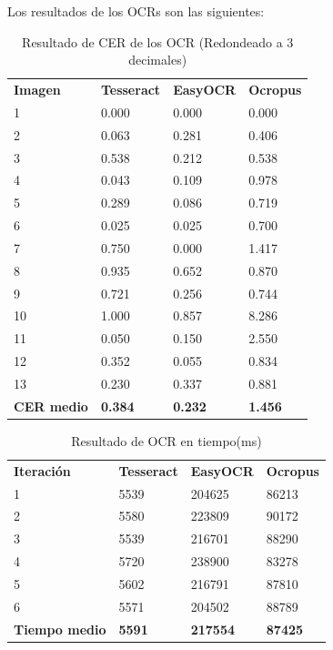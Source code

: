 Los resultados de los OCRs son las siguientes:
	\begin{table}[H]
		\centering
		\caption{Resultado de CER de los OCR (Redondeado a 3 decimales)}
		\begin{tabular}{llll}
			\textbf{Imagen} & \textbf{Tesseract} & \textbf{EasyOCR} &\textbf{Ocropus} \\
		1  & 0.000 & 0.000 & 0.000 \\
		2  & 0.063 & 0.281 & 0.406 \\
		3  & 0.538 & 0.212 & 0.538 \\
		4  & 0.043 & 0.109 & 0.978 \\
		5  & 0.289 & 0.086 & 0.719 \\
		6  & 0.025 & 0.025 & 0.700 \\
		7  & 0.750 & 0.000 & 1.417 \\
		8  & 0.935 & 0.652 & 0.870 \\
		9  & 0.721 & 0.256 & 0.744 \\
		10 & 1.000 & 0.857 & 8.286 \\
		11 & 0.050 & 0.150 & 2.550 \\
		12 & 0.352 & 0.055 & 0.834 \\
		13 & 0.230 & 0.337 & 0.881 \\
			\textbf{CER medio} & \textbf{0.384}& \textbf{0.232} & \textbf{1.456}\\
		\end{tabular}
		\label{table:TesseractResult}
	\end{table}
	\begin{table}[H]
	\centering
	\caption{Resultado de OCR en tiempo(ms)}
	\begin{tabular}{llll}
		\textbf{Iteración} & \textbf{Tesseract}& \textbf{EasyOCR}& \textbf{Ocropus} \\
		1  & 5539   & 204625 & 86213  \\
		2  & 5580   & 223809 & 90172  \\
		3  & 5539   & 216701 & 88290  \\
		4  & 5720   & 238900 & 83278  \\
		5  & 5602   & 216791 & 87810  \\
		6  & 5571   & 204502 & 88789  \\
		\textbf{Tiempo medio} & \textbf{5591}&\textbf{217554}&\textbf{87425} \\
		\end{tabular}
		\label{table:TesseractResultTime}
	\end{table}


